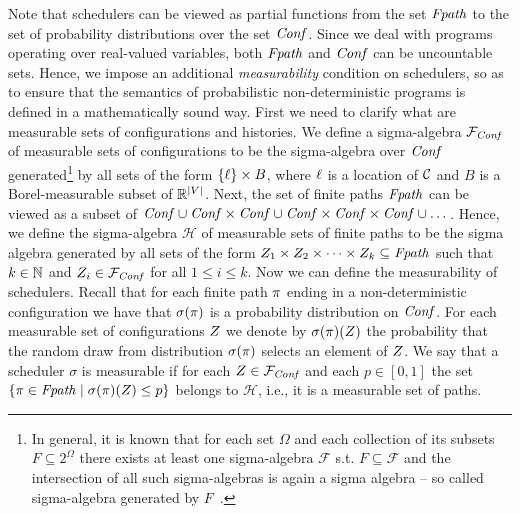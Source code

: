 \smallskip{}
Note that schedulers can be viewed as partial functions from the set $\mathit{Fpath}$ 
to the set of probability distributions over the set $\mathit{Conf}$.
Since we deal with programs operating over real-valued variables, both $\mathit{Fpath}$ 
and $\mathit{Conf}$ can be uncountable sets. Hence, we impose an 
additional \emph{measurability} condition on schedulers, so as to ensure that 
the semantics of probabilistic non-deterministic programs is defined in a 
mathematically 
sound way. First we need to clarify what are measurable sets of configurations 
and histories. We define a sigma-algebra $\mathcal{F}_{\mathit{Conf}}$ of measurable 
sets of configurations to be the sigma-algebra 
over $\mathit{Conf}$ 
generated\footnote{In general, it is known that for each set $\Omega$ and each 
collection of its subsets $F\subseteq 2^{\Omega}$ there exists at least one 
sigma-algebra $\mathcal{F}$ s.t. $F\subseteq \mathcal{F}$ and the intersection 
of all such sigma-algebras is again a sigma algebra --  so called sigma-algebra 
generated by $F$~\cite{Billingsley:book}.} by 
all sets of the form $\{\ell\}\times B$, where $\ell$ is a location of $\mathcal{C}$ 
and  
$B$ is a Borel-measurable subset 
of $\mathbb{R}^{|V|}$. Next, the set of finite paths $\mathit{Fpath}$ can be viewed as 
a subset of $\mathit{Conf}\cup \mathit{Conf}\times\mathit{Conf} \cup \mathit{Conf}\times\mathit{Conf}\times\mathit{Conf} \cup 
\dots$. Hence, we define the sigma-algebra $\mathcal{H}$ of measurable sets of 
finite paths 
to be the sigma algebra generated by all sets of the form $Z_1\times 
Z_2 \times 
\cdots \times Z_k \subseteq \mathit{Fpath}$ such that $k\in \mathbb{N}$ and 
$Z_i \in 
\mathcal{F}_{\mathit{Conf}}$ for 
all $1\leq i \leq k$. Now we can define the measurability of schedulers. Recall 
that for each finite path $\pi$ ending in a non-deterministic 
configuration 
we have that $\sigma(\pi)$ is a probability distribution on $\mathit{Conf}$. For 
each measurable set of configurations $Z$ we denote by 
$\sigma(\pi)(Z)$ the probability that the random draw from 
distribution $\sigma(\pi)$ selects an element of $Z$. We say that a 
scheduler $\sigma$ is measurable if for each $Z \in \mathcal{F}_{\mathit{Conf}}$ 
and each $p\in[0,1]$ the set $\{\pi \in \mathit{Fpath} \mid 
\sigma(\pi)(Z)\leq p\}$ belongs to $\mathcal{H}$, i.e., it is a 
measurable set of paths.


